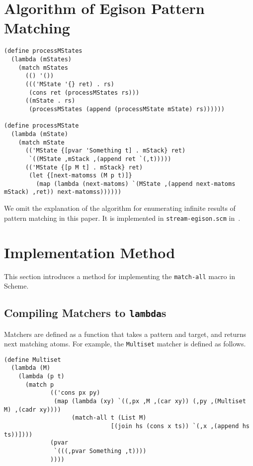 \documentclass[acmlarge]{acmart}
\begin{document}
\section{Algorithm of Egison Pattern Matching}\label{algorithm}


\begin{lstlisting}[language=egison]
(define processMStates
  (lambda (mStates)
    (match mStates
      (() '())
      ((('MState '{} ret) . rs)
       (cons ret (processMStates rs)))
      ((mState . rs)
       (processMStates (append (processMState mState) rs))))))

(define processMState
  (lambda (mState)
    (match mState
      (('MState {[pvar 'Something t] . mStack} ret)
       `((MState ,mStack ,(append ret `(,t)))))
      (('MState {[p M t] . mStack} ret)
       (let {[next-matomss (M p t)]}
         (map (lambda (next-matoms) `(MState ,(append next-matoms mStack) ,ret)) next-matomss))))))
\end{lstlisting}


We omit the explanation of the algorithm for enumerating infinite results of pattern matching in this paper.
It is implemented in \texttt{stream-egison.scm} in~\cite{egisonScheme}.

\section{Implementation Method}\label{method}

This section introduces a method for implementing the \texttt{match-all} macro in Scheme.

\subsection{Compiling Matchers to \texttt{lambda}s}

Matchers are defined as a function that takes a pattern and target, and returns next matching atoms.
For example, the \texttt{Multiset} matcher is defined as follows.

\begin{lstlisting}[language=egison]
(define Multiset
  (lambda (M)
    (lambda (p t)
      (match p
             (('cons px py)
              (map (lambda (xy) `((,px ,M ,(car xy)) (,py ,(Multiset M) ,(cadr xy))))
                   (match-all t (List M)
                              [(join hs (cons x ts)) `(,x ,(append hs ts))])))
             (pvar
              `(((,pvar Something ,t))))
             ))))
\end{lstlisting}
\end{document}
